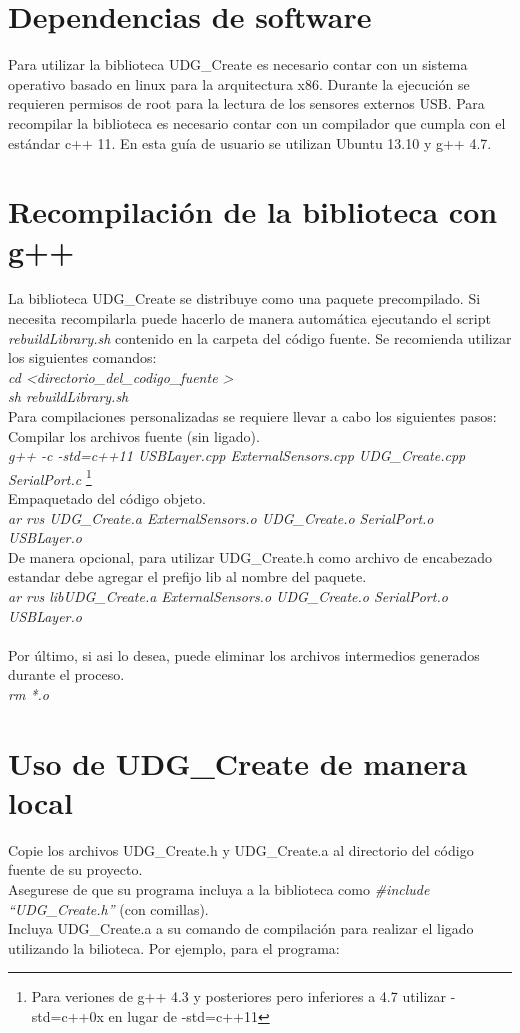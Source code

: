 \documentclass[letterpaper]{book}
\begin{document}
\section{Dependencias de software}
Para utilizar la biblioteca UDG\_Create es necesario contar con un sistema operativo basado en linux para la arquitectura x86. Durante la ejecución se requieren permisos de root para la lectura de los sensores externos USB. Para recompilar la biblioteca es necesario contar con un compilador que cumpla con el estándar c++ 11. En esta guía de usuario se utilizan Ubuntu 13.10 y g++ 4.7.
\section{Recompilación de la biblioteca con g++}
La biblioteca UDG\_Create se distribuye como una paquete precompilado. Si necesita recompilarla puede hacerlo de manera automática ejecutando el script \emph{rebuildLibrary.sh} contenido en la carpeta del código fuente. Se recomienda utilizar los siguientes comandos:\\
\emph{cd \textless directorio\_del\_codigo\_fuente \textgreater}\\
\emph{sh rebuildLibrary.sh}\\
Para compilaciones personalizadas se requiere llevar a cabo los siguientes pasos:\\
Compilar los archivos fuente (sin ligado).\\
\emph{g++ -c -std=c++11  USBLayer.cpp  ExternalSensors.cpp  UDG\_Create.cpp SerialPort.c }\footnote{Para veriones de g++ 4.3 y posteriores pero inferiores a 4.7 utilizar -std=c++0x en lugar de -std=c++11} \\
Empaquetado del código objeto.\\
\emph{ar rvs UDG\_Create.a ExternalSensors.o  UDG\_Create.o SerialPort.o USBLayer.o}\\
De manera opcional, para utilizar UDG\_Create.h como archivo de encabezado estandar debe agregar el prefijo lib al nombre del paquete.\\
\emph{\emph{ar rvs libUDG\_Create.a ExternalSensors.o  UDG\_Create.o SerialPort.o USBLayer.o}\\}\\
Por último, si asi lo desea, puede eliminar los archivos intermedios generados durante el proceso.\\
\emph{rm *.o}
\section{Uso de UDG\_Create de manera local}
Copie los archivos UDG\_Create.h y UDG\_Create.a al directorio del código fuente de su proyecto.\\
Asegurese de que su programa incluya a la biblioteca como \emph{\#include ``UDG\_Create.h''} (con comillas).\\
Incluya UDG\_Create.a a su comando de compilación para realizar el ligado utilizando la bilioteca. Por ejemplo, para el programa:\\
\end{document}

